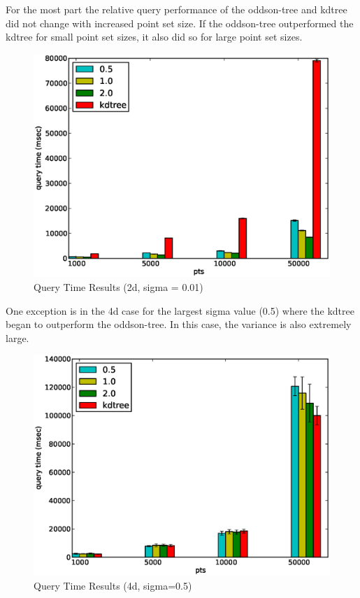 \documentclass[mcs]{scsthesis}
\begin{document}
For the most part the relative query performance of the oddson-tree and kdtree
did not change with increased point set size. If the oddson-tree outperformed
the kdtree for small point set sizes, it also did so for large point set sizes.

\begin{figure}
\begin{center}
\includegraphics[scale=0.5]{diagrams/2d_group_bypts_sigma0.01_qtime.eps}
\caption{Query Time Results (2d, sigma = 0.01)}
\end{center}
\end{figure}


One exception is in the 4d case for the largest sigma value (0.5) where the
kdtree began to outperform the oddson-tree. In this case, the variance is also
extremely large.

\begin{figure}
\begin{center}
\includegraphics[scale=0.5]{diagrams/4d_group_bypts_sigma0.5_qtime.eps}
\caption{Query Time Results (4d, sigma=0.5)}
\end{center}
\end{figure}
\end{document}
